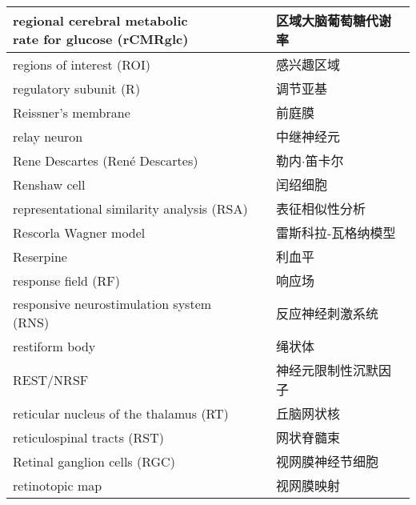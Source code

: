 \begin{longtable}{lll}
	\midrule
	\makecell[l]{regional cerebral metabolic \\rate for glucose (rCMRglc)}  && 区域大脑葡萄糖代谢率  \\
	
	\midrule
	regions of interest (ROI)   && 感兴趣区域  \\
	
	\midrule
	regulatory subunit (R)   && 调节亚基  \\
	
	\midrule
	Reissner’s membrane   && 前庭膜  \\
	
	\midrule
	relay neuron   && 中继神经元  \\
	
	\midrule
	Rene Descartes (René Descartes)  && 勒内$\cdot$笛卡尔  \\
	
	\midrule
	Renshaw cell   && 闰绍细胞  \\
	
	\midrule
	representational similarity analysis (RSA)  && 表征相似性分析  \\
	
	\midrule
	Rescorla Wagner model   && 雷斯科拉-瓦格纳模型  \\
	
	\midrule
	Reserpine   && 利血平  \\
	
	\midrule
	response field (RF)   && 响应场  \\
	
	\midrule
	responsive neurostimulation system (RNS)   && 反应神经刺激系统  \\
	
	\midrule
	restiform body   && 绳状体  \\
	
	\midrule
	REST/NRSF   && 神经元限制性沉默因子  \\
	
	\midrule
	reticular nucleus of the thalamus (RT)  && 丘脑网状核  \\
	
	\midrule
	reticulospinal tracts (RST)   && 网状脊髓束  \\
	
	\midrule
	Retinal ganglion cells (RGC)   && 视网膜神经节细胞  \\
	
	\midrule
	retinotopic map   && 视网膜映射  \\
	

\end{longtable}
